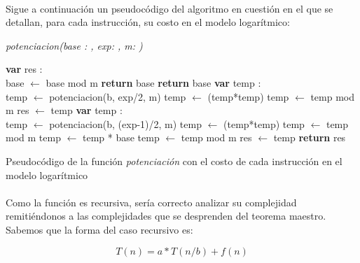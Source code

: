 \paragraph{}
Sigue a continuación un pseudocódigo del algoritmo en cuestión en el que se detallan, para cada instrucción, su costo en el modelo logarítmico: \\

\newpage
	\incmargin{1em}
	\linesnumbered

	\textsl{potenciacion(base : \nat,  exp: \nat,  m: \nat)}\\
		\begin{algorithm}[H]
			\BlankLine
			\textbf{var} res : \entero \\
			\BlankLine
			base $\leftarrow$ base mod m 
			\BlankLine
			 	{\textbf{return} base}
			{
				{\textbf{return} base}
			{
				{\textbf{var} temp : \entero \\
				temp $\leftarrow$ potenciacion(b, exp/2, m) 
				temp $\leftarrow$ (temp*temp) 
				temp $\leftarrow$ temp mod m 
				res $\leftarrow$ temp }
				{\textbf{var} temp : \entero \\
				temp $\leftarrow$ potenciacion(b, (exp-1)/2, m) 
				temp $\leftarrow$ (temp*temp) 
				temp $\leftarrow$ temp mod m 
				temp $\leftarrow$ temp * base 
				temp $\leftarrow$ temp mod m 
				res $\leftarrow$ temp }
			}}
			\BlankLine
			\textbf{return} res
			\caption{Pseudocódigo de la función \textit{potenciación} con el costo de cada instrucción en el modelo logarítmico}
		\end{algorithm}

\paragraph{}
Como la función es recursiva, sería correcto analizar su complejidad remitiéndonos a las complejidades que se desprenden del teorema maestro. Sabemos que la forma del caso recursivo es:

\begin{equation}
	T(n) = a*T(n/b) + f(n)
\end{equation}


